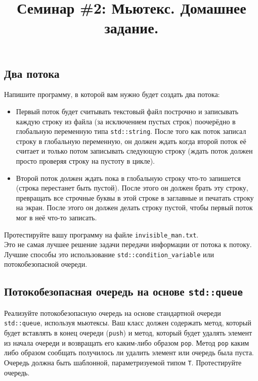 \documentclass{article}
\begin{document}
\title{Семинар \#2: Мьютекс. Домашнее задание.\vspace{-5ex}}\date{}\maketitle
\subsection{Два потока}
Напишите программу, в которой вам нужно будет создать два потока:

\begin{itemize}
\item Первый поток будет считывать текстовый файл построчно и записывать каждую строку из файла (за исключением пустых строк) поочерёдно в глобальную переменную типа \texttt{std::string}. После того как поток записал строку в глобальную переменную, он должен ждать когда второй поток её считает и только потом записывать следующую строку (ждать поток должен просто проверяя строку на пустоту в цикле).

\item Второй поток должен ждать пока в глобальную строку что-то запишется (строка перестанет быть пустой). После этого он должен брать эту строку, превращать все строчные буквы в этой строке в заглавные и печатать строку на экран. После этого он должен делать строку пустой, чтобы первый поток мог в неё что-то записать.
\end{itemize}
Протестируйте вашу программу на файле \texttt{invisible\_man.txt}.\\
Это не самая лучшее решение задачи передачи информации от потока к потоку. Лучшие способы это использование \texttt{std::condition\_variable} или потокобезопасной очереди.


\subsection{Потокобезопасная очередь на основе \texttt{std::queue}}
Реализуйте потокобезопасную очередь на основе стандартной очереди \texttt{std::queue}, используя мьютексы.
Ваш класс должен содержать метод, который будет вставлять в конец очереди (\texttt{push}) и метод, который будет удалять элемент из начала очереди и возвращать его каким-либо образом \texttt{pop}. Метод \texttt{pop} каким либо образом сообщать получилось ли удалить элемент или очередь была пуста.\\
Очередь должна быть шаблонной, параметризуемой типом \texttt{T}. Протестируйте очередь.
\end{document}

